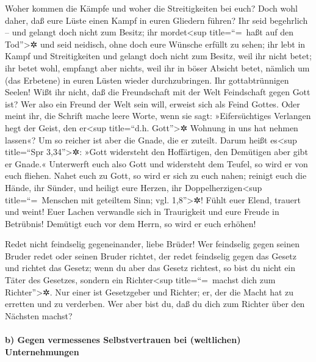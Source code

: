  Woher kommen die Kämpfe und woher die Streitigkeiten bei
euch? Doch wohl daher, daß eure Lüste einen Kampf in euren Gliedern
führen?  Ihr seid begehrlich -- und gelangt doch nicht zum
Besitz; ihr mordet\textless sup title=``=~haßt auf den
Tod''\textgreater✲ und seid neidisch, ohne doch eure Wünsche erfüllt zu
sehen; ihr lebt in Kampf und Streitigkeiten und gelangt doch nicht zum
Besitz, weil ihr nicht betet;  ihr betet wohl, empfangt
aber nichts, weil ihr in böser Absicht betet, nämlich um (das Erbetene)
in euren Lüsten wieder durchzubringen.  Ihr
gottabtrünnigen Seelen! Wißt ihr nicht, daß die Freundschaft mit der
Welt Feindschaft gegen Gott ist? Wer also ein Freund der Welt sein will,
erweist sich als Feind Gottes.  Oder meint ihr, die
Schrift mache leere Worte, wenn sie sagt: »Eifersüchtiges Verlangen hegt
der Geist, den er\textless sup title=``d.h. Gott''\textgreater✲ Wohnung
in uns hat nehmen lassen«?  Um so reicher ist aber die
Gnade, die er zuteilt. Darum heißt es\textless sup title=``Spr
3,34''\textgreater✲: »Gott widersteht den Hoffärtigen, den Demütigen
aber gibt er Gnade.«  Unterwerft euch also Gott und
widersteht dem Teufel, so wird er von euch fliehen.  Nahet
euch zu Gott, so wird er sich zu euch nahen; reinigt euch die Hände, ihr
Sünder, und heiligt eure Herzen, ihr Doppelherzigen\textless sup
title=``=~Menschen mit geteiltem Sinn; vgl. 1,8''\textgreater✲!
 Fühlt euer Elend, trauert und weint! Euer Lachen
verwandle sich in Traurigkeit und eure Freude in Betrübnis!
 Demütigt euch vor dem Herrn, so wird er euch erhöhen!

 Redet nicht feindselig gegeneinander, liebe Brüder! Wer
feindselig gegen seinen Bruder redet oder seinen Bruder richtet, der
redet feindselig gegen das Gesetz und richtet das Gesetz; wenn du aber
das Gesetz richtest, so bist du nicht ein Täter des Gesetzes, sondern
ein Richter\textless sup title=``=~machst dich zum
Richter''\textgreater✲.  Nur einer ist Gesetzgeber und
Richter; er, der die Macht hat zu erretten und zu verderben. Wer aber
bist du, daß du dich zum Richter über den Nächsten machst?

\hypertarget{b-gegen-vermessenes-selbstvertrauen-bei-weltlichen-unternehmungen}{%
\paragraph{b) Gegen vermessenes Selbstvertrauen bei (weltlichen)
Unternehmungen}\label{b-gegen-vermessenes-selbstvertrauen-bei-weltlichen-unternehmungen}}

